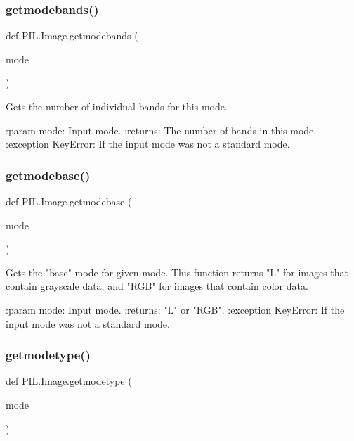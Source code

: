 \subsubsection{\texorpdfstring{getmodebands()}{getmodebands()}}
{\footnotesize\ttfamily def P\+I\+L.\+Image.\+getmodebands (\begin{DoxyParamCaption}\item[{}]{mode }\end{DoxyParamCaption})}

\begin{DoxyVerb}Gets the number of individual bands for this mode.

:param mode: Input mode.
:returns: The number of bands in this mode.
:exception KeyError: If the input mode was not a standard mode.
\end{DoxyVerb}
 \mbox{\label{namespacePIL_1_1Image_a7d4b86f15fb169471254d5239a94bf64}} 
\subsubsection{\texorpdfstring{getmodebase()}{getmodebase()}}
{\footnotesize\ttfamily def P\+I\+L.\+Image.\+getmodebase (\begin{DoxyParamCaption}\item[{}]{mode }\end{DoxyParamCaption})}

\begin{DoxyVerb}Gets the "base" mode for given mode.  This function returns "L" for
images that contain grayscale data, and "RGB" for images that
contain color data.

:param mode: Input mode.
:returns: "L" or "RGB".
:exception KeyError: If the input mode was not a standard mode.
\end{DoxyVerb}
 \mbox{\label{namespacePIL_1_1Image_ae7953cd6e6a3ad042c5187330c0314fc}} 
\subsubsection{\texorpdfstring{getmodetype()}{getmodetype()}}
{\footnotesize\ttfamily def P\+I\+L.\+Image.\+getmodetype (\begin{DoxyParamCaption}\item[{}]{mode }\end{DoxyParamCaption})}

